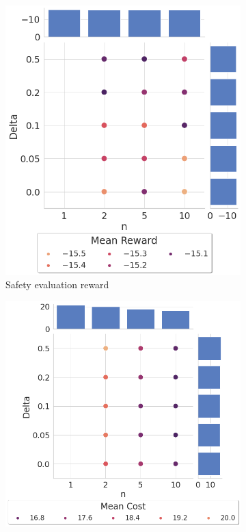 \begin{figure}
\begin{subfigure}[b]{.49\textwidth}
    \includegraphics[width=\textwidth]{images/results/push-barrier-state/safety_eval_reward.png}
    \caption{Safety evaluation reward}
    \label{fig:results:barrier-state-safety-eval-reward}
    \end{subfigure}
    \hfill
    \begin{subfigure}[b]{.6\textwidth}
    \centering
    \includegraphics[width=\textwidth]{images/results/push-barrier-state/safety_eval_cost.png}

\end{subfigure}
\end{figure}
